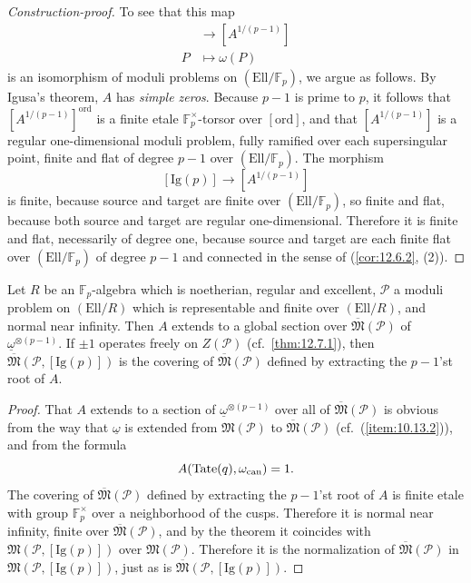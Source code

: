 \begin{proof}[Construction-proof]
To see that this map
\begin{align*}
[\mathrm{Ig}(p)] &\to [A^{1/(p-1)}] \\
P &\mapsto \omega(P)
\end{align*}
is an isomorphism of moduli problems on $(\mathrm{Ell}/\mathbb{F}_p)$, we argue as follows. By Igusa's theorem, $A$ has \emph{simple zeros}. Because $p-1$ is prime to $p$, it follows that $[A^{1/(p-1)}]^{\mathrm{ord}}$ is a finite etale $\mathbb{F}_p^\times$-torsor over $[\mathrm{ord}]$, and that $[A^{1/(p-1)}]$ is a regular one-dimensional moduli problem, fully ramified over each supersingular point, finite and flat of degree $p-1$ over $(\mathrm{Ell}/\mathbb{F}_p)$. The morphism
\[
[\mathrm{Ig}(p)] \to [A^{1/(p-1)}]
\]
is finite, because source and target are finite over $(\mathrm{Ell}/\mathbb{F}_p)$, so finite and flat, because both source and target are regular one-dimensional. Therefore it is finite and flat, necessarily of degree one, because source and target are each finite flat over $(\mathrm{Ell}/\mathbb{F}_p)$ of degree $p-1$ and connected in the sense of (\ref{cor:12.6.2}, (2)).
\end{proof}

\begin{kcor}\label{cor:12.8.3}
Let $R$ be an $\mathbb{F}_p$-algebra which is noetherian, regular and excellent, $\mathcal{P}$ a moduli problem on $(\mathrm{Ell}/R)$ which is representable and finite over $(\mathrm{Ell}/R)$, and normal near infinity. Then $A$ extends to a global section over $\overline{\mathfrak{M}}(\mathcal{P})$ of $\underline{\omega}^{\otimes(p-1)}$. If $\pm 1$ operates freely on $Z(\mathcal{P})$ (cf.~\ref{thm:12.7.1}), then $\overline{\mathfrak{M}}(\mathcal{P}, [\mathrm{Ig}(p)])$ is the covering of $\overline{\mathfrak{M}}(\mathcal{P})$ defined by extracting the $p-1$'st root of $A$.
\end{kcor}

\begin{proof}
That $A$ extends to a section of $\underline{\omega}^{\otimes(p-1)}$ over all of $\overline{\mathfrak{M}}(\mathcal{P})$ is obvious from the way that $\underline{\omega}$ is extended from $\mathfrak{M}(\mathcal{P})$ to $\overline{\mathfrak{M}}(\mathcal{P})$ (cf.~(\ref{item:10.13.2})), and from the formula
\[
A(\mathrm{Tate}(q), \omega_{\mathrm{can}}) = 1 .
\]
The covering of $\overline{\mathfrak{M}}(\mathcal{P})$ defined by extracting the $p-1$'st root of $A$ is finite etale with group $\mathbb{F}_p^\times$ over a neighborhood of the cusps. Therefore it is normal near infinity, finite over $\overline{\mathfrak{M}}(\mathcal{P})$, and by the theorem it coincides with $\mathfrak{M}(\mathcal{P}, [\mathrm{Ig}(p)])$ over $\mathfrak{M}(\mathcal{P})$. Therefore it is the normalization of $\overline{\mathfrak{M}}(\mathcal{P})$ in $\mathfrak{M}(\mathcal{P}, [\mathrm{Ig}(p)])$, just as is $\overline{\mathfrak{M}}(\mathcal{P}, [\mathrm{Ig}(p)])$.
\end{proof}

